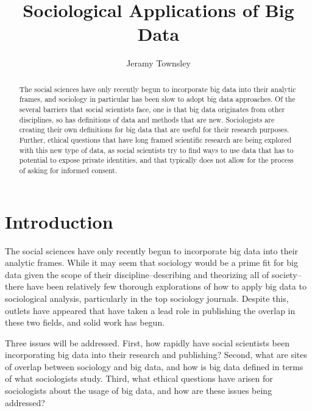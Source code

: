 \documentclass[sigconf]{acmart}
\begin{document}
\title{Sociological Applications of Big Data}


\author{Jeramy Townsley}


\renewcommand{\shortauthors}{B. Trovato et al.}


\begin{abstract}
The social sciences have only recently begun to incorporate big data into their analytic frames, and sociology in particular has been slow to adopt big data approaches.  Of the several barriers that social scientists face, one is that big data  originates from other disciplines, so has definitions of data and methods that are new.  Sociologists are creating their own definitions for big data that are useful for their research purposes.  Further, ethical questions that have long framed scientific research are being explored with this new type of data, as social scientists try to find ways to use data that has to potential to expose private identities, and that typically does not allow for the process of asking for informed consent.
\end{abstract}



\maketitle

\section{Introduction}


The social sciences have only recently begun to incorporate big data into their analytic frames.  While it may seem that sociology would be a prime fit for big data given the scope of their discipline--describing and theorizing all of society--there have been relatively few thorough explorations of how to apply big data to sociological analysis, particularly in the top sociology journals.  Despite this, outlets have appeared that have taken a lead role in publishing the overlap in these two fields, and solid work has begun. 

Three issues will be addressed.  First, how rapidly have social scientists been incorporating big data into their research and publishing?  Second, what are sites of overlap between sociology and big data, and how is big data defined in terms of what sociologists study.  Third, what ethical questions have arisen for sociologists about the usage of big data, and how are these issues being addressed?  
\end{document}
